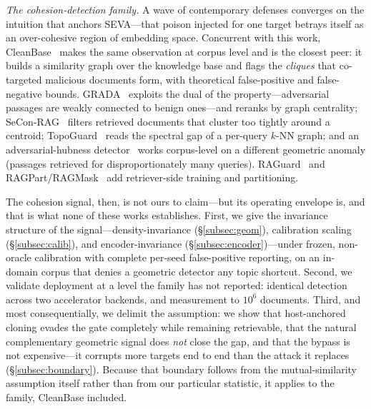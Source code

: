 \documentclass[10pt,journal,compsoc]{IEEEtran}
\begin{document}
\emph{The cohesion-detection family.} A wave of contemporary defenses converges on the
intuition that anchors SEVA---that poison injected for one target betrays itself as an
over-cohesive region of embedding space. Concurrent with this work, CleanBase~\cite{cleanbase}
makes the same observation at corpus level and is the closest peer: it builds a similarity graph
over the knowledge base and flags the \emph{cliques} that co-targeted malicious documents form,
with theoretical false-positive and false-negative bounds. GRADA~\cite{grada} exploits the dual
of the property---adversarial passages are weakly connected to benign ones---and reranks by graph
centrality; SeCon-RAG~\cite{secon} filters retrieved documents that cluster too tightly around a
centroid; TopoGuard~\cite{topoguard} reads the spectral gap of a per-query $k$-NN graph; and an
adversarial-hubness detector~\cite{hubness} works corpus-level on a different geometric anomaly
(passages retrieved for disproportionately many queries). RAGuard~\cite{raguard} and
RAGPart/RAGMask~\cite{ragpart} add retriever-side training and partitioning.

The cohesion signal, then, is not ours to claim---but its operating envelope is, and
that is what none of these works establishes.
First, we give the invariance structure of the signal---density-invariance
(\S\ref{subsec:geom}), calibration scaling (\S\ref{subsec:calib}), and encoder-invariance
(\S\ref{subsec:encoder})---under frozen, non-oracle calibration with complete per-seed
false-positive reporting, on an in-domain corpus that denies a geometric detector any topic
shortcut. Second, we validate deployment at a level the family has not reported: identical
detection across two accelerator backends, and measurement to $10^6$ documents. Third, and most consequentially, we delimit the assumption:
we show that host-anchored cloning evades the gate completely while remaining retrievable, that
the natural complementary geometric signal does \emph{not} close the gap, and that the bypass is
not expensive---it corrupts more targets end to end than the attack it replaces
(\S\ref{subsec:boundary}). Because that
boundary follows from the mutual-similarity assumption itself rather than from our particular
statistic, it applies to the family, CleanBase included.
\end{document}
